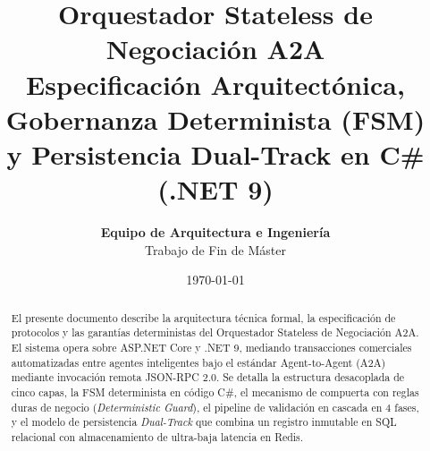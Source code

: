\documentclass[11pt,a4paper]{article}
\title{\textbf{\LARGE Orquestador Stateless de Negociación A2A}\\[0.4cm]
\large Especificación Arquitectónica, Gobernanza Determinista (FSM)\\y Persistencia Dual-Track en C\# (.NET 9)}
\author{\textbf{Equipo de Arquitectura e Ingeniería}\\Trabajo de Fin de Máster}
\date{\today}
\begin{document}
\maketitle

\begin{abstract}
El presente documento describe la arquitectura técnica formal, la especificación de protocolos y las garantías deterministas del Orquestador Stateless de Negociación A2A. El sistema opera sobre ASP.NET Core y .NET 9, mediando transacciones comerciales automatizadas entre agentes inteligentes bajo el estándar Agent-to-Agent (A2A) mediante invocación remota JSON-RPC 2.0. Se detalla la estructura desacoplada de cinco capas, la FSM determinista en código C\#, el mecanismo de compuerta con reglas duras de negocio (\textit{Deterministic Guard}), el pipeline de validación en cascada en 4 fases, y el modelo de persistencia \textit{Dual-Track} que combina un registro inmutable en SQL relacional con almacenamiento de ultra-baja latencia en Redis.
\end{abstract}

\vspace{0.5cm}
\tableofcontents
\newpage


\newpage

\newpage

\newpage

\end{document}
